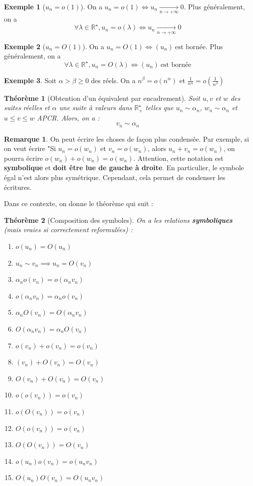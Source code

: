 \documentclass[french]{book}
\newcommand{\R}{\mathbb{R}}
\newcommand{\st}{^\star}
\theoremstyle{plain}
\newtheorem{thm}{Théorème}[chapter]
\theoremstyle{definition}
\newtheorem{exa}{Exemple}[chapter]
\newtheorem{rmq}{Remarque}[chapter]
\theoremstyle{remark}
\begin{document}
\begin{exa}[$u_n=o(1)$]
	On a $u_n=o(1)\Longleftrightarrow u_n\xrightarrow[n\to+\infty]{}0$. Plus généralement, on a $$\forall \lambda\in\R\st, u_n=o(\lambda)\Longleftrightarrow u_n\xrightarrow[n\to+\infty]{}0$$
\end{exa}
\begin{exa}[$u_n=O(1)$]
	On a $u_n=O(1)\Longleftrightarrow (u_n) \ \text{est bornée}$. Plus généralement, on a $$\forall \lambda\in\R\st, u_n=O(\lambda)\Longleftrightarrow (u_n) \ \text{est bornée}$$
\end{exa}
\begin{exa}
	Soit $\alpha>\beta\geqslant0$ des réels. On a $n^\beta=o(n^\alpha)$ et $\displaystyle\frac{1}{n^\alpha}=o\left(\frac{1}{n^\beta}\right)$
\end{exa}
\begin{thm}[Obtention d'un équivalent par encadrement]
	Soit $u,v$ et $w$ des suites réelles et $\alpha$ une suite à valeurs dans $\R_+\st$ telles que $u_n\sim\alpha_n$, $w_n\sim\alpha_n$ et $u\leqslant v\leqslant w$ APCR. Alors, on a : $$v_n\sim\alpha_n$$
\end{thm}
\begin{rmq}
	On peut écrire les choses de façon plus condensée. Par exemple, si on veut écrire "Si $u_n=o(w_n)$ et $v_n=o(w_n)$, alors $u_n+v_n=o(w_n)$, on pourra écrire $o(w_n)+o(w_n)=o(w_n)$. Attention, cette notation est \textbf{symbolique} et \textbf{doit être lue de gauche à droite}. En particulier, le symbole égal n'est alors plus symétrique. Cependant, cela permet de condenser les écritures.
\end{rmq}
Dans ce contexte, on donne le théorème qui suit :
\begin{thm}[Composition des symboles]
	On a les relations \textbf{symboliques} (mais vraies si correctement reformulées) :
	\begin{enumerate}
		\item $o(u_n)=O(u_n)$
		\item $u_n\sim v_n \implies u_n=O(v_n)$
		\item $\alpha_n o(v_n)=o(\alpha_n v_n)$
		\item $o(\alpha_n v_n)=\alpha_n o(v_n)$
		\item $\alpha_n O(v_n)=O(\alpha_n v_n)$
		\item $O(\alpha_n v_n)=\alpha_n O(v_n)$
		\item $o(v_n)+o(v_n)=o(v_n)$
		\item $(v_n)+O(v_n)=O(v_n)$
		\item $O(v_n)+O(v_n)=O(v_n)$
		\item $o(o(v_n))=o(v_n)$
		\item $o(O(v_n))=o(v_n)$
		\item $O(o(v_n))=o(v_n)$
		\item $O(O(v_n))=O(v_n)$
		\item $o(u_n)o(v_n)=o(u_n v_n)$
		\item $O(u_n)O(v_n)=O(u_n v_n)$
	\end{enumerate}
\end{thm}
\end{document}
